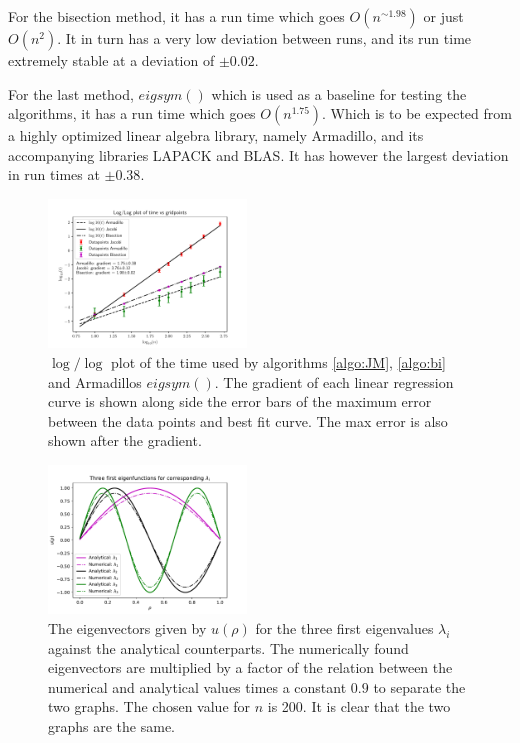 \documentclass[%
reprint,
nofootinbib,
amsmath,amssymb,
aps,
]{revtex4-1}
\begin{document}
For the bisection method, it has a run time which goes $O(n^{\sim 1.98})$ or just $O(n^2)$. It in turn has a very low deviation between runs, and its run time extremely stable at a deviation of $\pm 0.02$. 

For the last method, $eigsym()$ which is used as a baseline for testing the algorithms, it has a run time which goes $O(n^{1.75})$. Which is to be expected from a highly optimized linear algebra library, namely Armadillo, and its accompanying libraries LAPACK and BLAS. It has however the largest deviation in run times at $\pm 0.38$. 
\begin{figure}[h]
	\centering
	\includegraphics[width=0.47\textwidth]{../code/BB_plot/timecomp.pdf}
	\caption{$\log/\log$ plot of the time used by algorithms \ref{algo:JM}, \ref{algo:bi} and Armadillos $eigsym()$. The gradient of each linear regression curve is shown along side the error bars of the maximum error between the data points and best fit curve. The max error is also shown after the gradient. }
	\label{fig:timecomparison}
\end{figure}

\begin{figure}[h]
	\centering
	\includegraphics[width=0.47\textwidth]{../code/BB_plot/eigenvec.pdf}
	\caption{The eigenvectors given by $u(\rho)$ for the three first eigenvalues $\lambda_i$ against the analytical counterparts. The numerically found eigenvectors are multiplied by a factor of the relation between the numerical and analytical values times a constant $0.9$ to separate the two graphs. The chosen value for $n$ is 200. It is clear that the two graphs are the same.}
	\label{fig:eigenfunction}
\end{figure}
\end{document}
